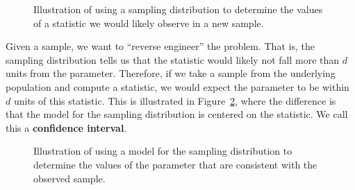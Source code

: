 \documentclass[
  letterpaper,
  DIV=11,
  numbers=noendperiod]{scrreprt}
\theoremstyle{definition}
\theoremstyle{plain}
\theoremstyle{definition}
\theoremstyle{remark}
\begin{document}
\begin{figure}


\caption{\label{fig-inference-samplingdistribution}Illustration of using
a sampling distribution to determine the values of a statistic we would
likely observe in a new sample.}

\end{figure}%

Given a sample, we want to ``reverse engineer'' the problem. That is,
the sampling distribution tells us that the statistic would likely not
fall more than \(d\) units from the parameter. Therefore, if we take a
sample from the underlying population and compute a statistic, we would
expect the parameter to be within \(d\) units of this statistic. This is
illustrated in Figure~\ref{fig-inference-model}, where the difference is
that the model for the sampling distribution is centered on the
statistic. We call this a \textbf{confidence interval}.

\begin{figure}


\caption{\label{fig-inference-model}Illustration of using a model for
the sampling distribution to determine the values of the parameter that
are consistent with the observed sample.}

\end{figure}%
\end{document}
